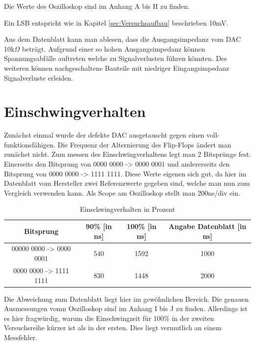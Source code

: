 Die Werte des Oszilloskop sind im Anhang A bis H zu finden.

Ein LSB entspricht wie in Kapitel \ref{sec:Versuchsaufbau} beschrieben 10mV.

Aus dem Datenblatt kann man ablesen, dass die Ausgangsimpedanz vom
DAC 10k$\Omega$ beträgt. Aufgrund einer so hohen Ausgangsimpedanz 
können Spannungsabfälle auftreten welche zu Signalverlusten führen 
könnten. Des weiteren können nachgeschaltene Bauteile mit niedriger
Eingangsimpedanz Signalverluste erleiden.




\section{Einschwingverhalten}

Zunächst einmal wurde der defekte DAC ausgetauscht 
gegen einen voll-funktionsfähigen. \newline
Die Frequenz der Alternierung des Flip-Flops ändert man zunächst nicht. \newline
Zum messen des Einschwingverhaltens legt man 2 Bitsprünge fest.
Einerseits den Bitsprung von 0000 0000 -> 0000 0001 und andererseits 
den Bitsprung von 0000 0000 -> 1111 1111.
Diese Werte eigenen sich gut, da hier im Datenblatt vom Hersteller 
zwei Referenzwerte gegeben sind, welche man nun zum Vergleich verwenden kann.\newline
Als Scope am Oszilloskop stellt man 200ns/div ein. \newline

\begin{table}[h]
	\centering
	\begin{tabular}[h]{c|c|c|c}
		Bitsprung & 90\% [in ns] & 100\% [in ns] & Angabe Datenblatt [in ns] \\
		\hline
		00000 0000 -> 0000 0001 & 540 & 1592 & 1000\\
		\hline
		0000 0000 -> 1111 1111 & 830 & 1448 & 2000\\
	\end{tabular}
	\caption{Einschwingverhalten in Prozent}
	\label{tab:Einschwingverhalten}
\end{table}

Die Abweichung zum Datenblatt liegt hier im gewöhnlichen Bereich.
Die genauen Ausmessungen vomn Oszilloskop sind im Anhang I bis J zu finden.
Allerdings ist es hier fragwürdig, warum die Einschwingzeit für 100\% in der
zweiten Versuchsreihe kürzer ist als in der ersten. Dies liegt vermutlich an
einem Messfehler. \newline 


